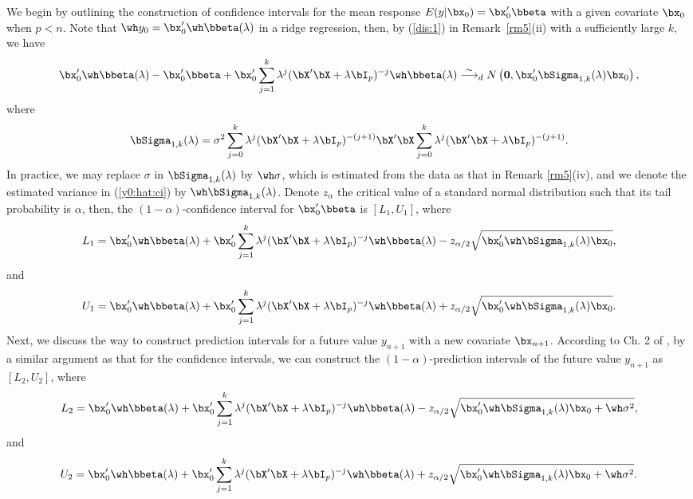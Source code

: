 We begin by outlining the construction of confidence intervals for the mean response  $E(y|\bx_0)=\bx_0'\bbeta$ with a given covariate $\bx_0$ when $p<n$. Note that $\wh y_0=\bx_0'\wh\bbeta(\lambda)$ in a ridge regression, then, by (\ref{dis:1}) in Remark~\ref{rm5}(ii) with a sufficiently large $k$, we have
\begin{equation}\label{y0:hat:ci}
    \bx_0'\wh\bbeta(\lambda)-\bx_0'\bbeta+\bx_0'\sum_{j=1}^k\lambda^j(\bX'\bX+\lambda\bI_p)^{-j}\wh\bbeta(\lambda)\overset{\sim}{\longrightarrow}_d N\left({\bf 0},\bx_0'\bSigma_{1,k}(\lambda)\bx_0\right),
\end{equation}
where 
\[\bSigma_{1,k}(\lambda)=\sigma^2\sum_{j=0}^k \lambda^j(\bX'\bX+\lambda\bI_p)^{-(j+1)}\bX'\bX\sum_{j=0}^k \lambda^j(\bX'\bX+\lambda\bI_p)^{-(j+1)}.\]
In practice, we may replace $\sigma$ in $\bSigma_{1,k}(\lambda)$ by $\wh\sigma$, which is estimated from the data as that in Remark \ref{rm5}(iv), and we denote the estimated variance in (\ref{y0:hat:ci}) by $\wh\bSigma_{1,k}(\lambda)$. Denote $z_{\alpha}$ the critical value of a standard normal distribution such that its tail probability is $\alpha$, then, the $(1-\alpha)$-confidence interval for $\bx_0'\bbeta$  is $[L_1,U_1]$, where
\begin{equation}\label{l1}
   L_1=\bx_0'\wh\bbeta(\lambda)+\bx_0'\sum_{j=1}^k\lambda^j(\bX'\bX+\lambda\bI_p)^{-j}\wh\bbeta(\lambda)-z_{\alpha/2}\sqrt{\bx_0'\wh\bSigma_{1,k}(\lambda)\bx_0},
\end{equation}
and
\begin{equation}\label{u1}
   U_1=\bx_0'\wh\bbeta(\lambda)+\bx_0'\sum_{j=1}^k\lambda^j(\bX'\bX+\lambda\bI_p)^{-j}\wh\bbeta(\lambda)+z_{\alpha/2}\sqrt{\bx_0'\wh\bSigma_{1,k}(\lambda)\bx_0}.
\end{equation}
Next, we discuss the way to construct prediction intervals for a future value $y_{n+1}$ with a new covariate $\bx_{n+1}$. According to Ch. 2 of \cite{montgomery2012introduction}, by a similar argument as that for the confidence intervals, we can construct the $(1-\alpha)$-prediction intervals of the future value $y_{n+1}$ as $[L_2,U_2]$, where
\begin{equation}\label{l2}
   L_2=\bx_0'\wh\bbeta(\lambda)+\bx_0'\sum_{j=1}^k\lambda^j(\bX'\bX+\lambda\bI_p)^{-j}\wh\bbeta(\lambda)-z_{\alpha/2}\sqrt{\bx_0'\wh\bSigma_{1,k}(\lambda)\bx_0+\wh\sigma^2},
\end{equation}
and
\begin{equation}\label{u2}
   U_2=\bx_0'\wh\bbeta(\lambda)+\bx_0'\sum_{j=1}^k\lambda^j(\bX'\bX+\lambda\bI_p)^{-j}\wh\bbeta(\lambda)+z_{\alpha/2}\sqrt{\bx_0'\wh\bSigma_{1,k}(\lambda)\bx_0+\wh\sigma^2}.
\end{equation}

